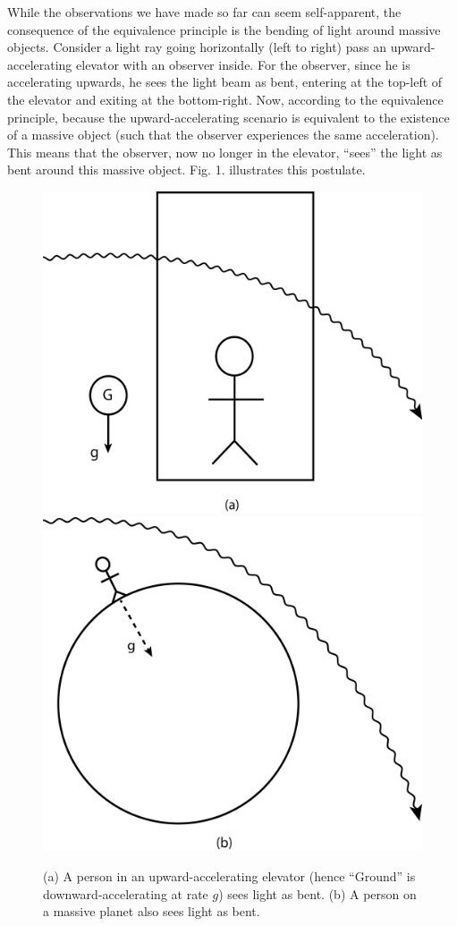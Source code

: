 \documentclass{book}
\theoremstyle{definition}
\begin{document}
While the observations we have made so far can seem self-apparent, the consequence of the equivalence principle is the bending of light around massive objects. Consider a light ray going horizontally (left to right) pass an upward-accelerating elevator with an observer inside. For the observer, since he is accelerating upwards, he sees the light beam as bent, entering at the top-left of the elevator and exiting at the bottom-right. Now, according to the equivalence principle, because the upward-accelerating scenario is equivalent to the existence of a massive object (such that the observer experiences the same acceleration). This means that the observer, now no longer in the elevator, ``sees'' the light as bent around this massive object. Fig. 1. illustrates this postulate.\\
\begin{figure}[h!]
	\centering
	\includegraphics[scale=0.15]{gr-fig-1a.png}
	\includegraphics[scale=0.15]{gr-fig-1b.png}
	\caption{(a) A person in an upward-accelerating elevator (hence ``Ground'' is downward-accelerating at rate $g$) sees light as bent. (b) A person on a massive planet also sees light as bent.}
\end{figure}
\end{document}
